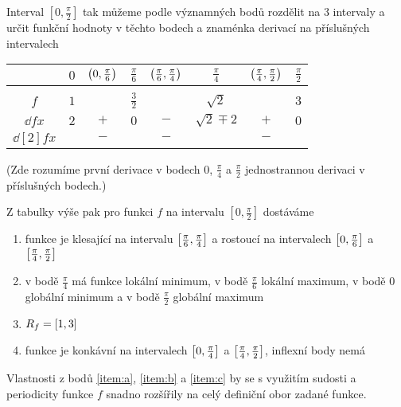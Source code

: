 \documentclass[answers]{exam}
\begin{document}
\begin{questions}
\begin{solution}
\begin{enumerate}
    		Interval $[0, \frac{\pi}{2}]$ tak můžeme podle významných bodů rozdělit na $3$ intervaly a určit funkční hodnoty v těchto bodech a znaménka derivací na příslušných intervalech
    		\begin{center}
	    		\begin{tabular}{c|ccccccc}
	    			& $0$ & $\parens{0, \frac{\pi}{6}}$ & $\frac{\pi}{6}$ & $\parens{\frac{\pi}{6}, \frac{\pi}{4}}$ & $\frac{\pi}{4}$ & $\parens{\frac{\pi}{4}, \frac{\pi}{2}}$ & $\frac{\pi}{2}$ \\[2pt]
	    			\hline \\[-8pt]
	    			$f$ & $1$ & & $\frac{3}{2}$ & & $\sqrt{2}$ & & $3$  \\[3pt]
	    			$\dd{f}{x}$ & $2$ & $+$ & $0$ & $-$ & $\sqrt{2} \mp 2$ & $+$ & $0$ \\[3pt]
	    			$\dd[2]{f}{x}$ & & $-$ & & $-$ & & $-$
	    		\end{tabular}
    		\end{center}
    		(Zde rozumíme  první derivace v bodech $0$, $\frac{\pi}{4}$ a $\frac{\pi}{2}$ jednostrannou derivaci v příslušných bodech.)
    		
    		Z tabulky výše pak pro funkci $f$ na intervalu $[0, \frac{\pi}{2}]$ dostáváme
    		\begin{enumerate}
    			\item \label{item:a} funkce je klesající na intervalu $\brackets{\frac{\pi}{6}, \frac{\pi}{4}}$ a rostoucí na intervalech $\brackets{0, \frac{\pi}{6}}$ a $\brackets{\frac{\pi}{4}, \frac{\pi}{2}}$
    			\item \label{item:b} v bodě $\frac{\pi}{4}$ má funkce lokální minimum, v bodě $\frac{\pi}{6}$  lokální maximum, v bodě $0$ globální minimum a v bodě $\frac{\pi}{2}$ globální maximum
    			\item $R_f = \brackets{1, 3}$
    			\item \label{item:c} funkce je konkávní na intervalech $\brackets{0, \frac{\pi}{4}}$ a $\brackets{\frac{\pi}{4}, \frac{\pi}{2}}$, inflexní body nemá
    		\end{enumerate}
    		
    		Vlastnosti z bodů \ref{item:a}, \ref{item:b} a \ref{item:c} by se s využitím sudosti a periodicity funkce $f$ snadno rozšířily na celý definiční obor zadané funkce.
    		

\end{enumerate}
\end{solution}
\end{questions}
\end{document}
